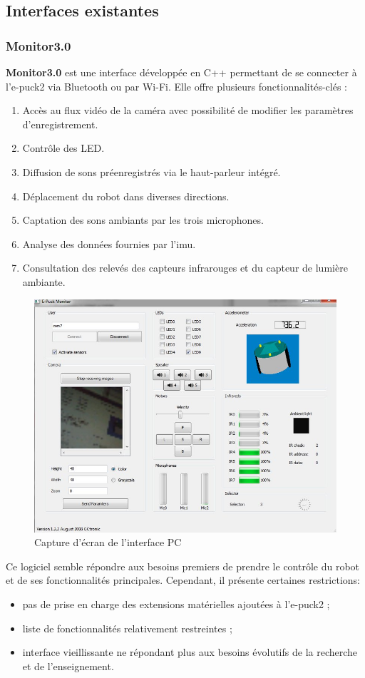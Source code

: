 \subsection{Interfaces existantes} \label{sec:interfaces_existantes}

\subsubsection{Monitor3.0}
\textbf{Monitor3.0} est une interface développée en C++ permettant de se connecter à l'e-puck2 via Bluetooth \autocite{noauthor_e-puck2monitor_2024} ou par Wi-Fi.
Elle offre plusieurs fonctionnalités-clés :
\begin{enumerate}
    \item Accès au flux vidéo de la caméra avec possibilité de modifier les paramètres d'enregistrement.  
    \item Contrôle des LED.  
    \item Diffusion de sons préenregistrés via le haut-parleur intégré.  
    \item Déplacement du robot dans diverses directions.  
    \item Captation des sons ambiants par les trois microphones.  
    \item Analyse des données fournies par l'\acrshort{imu}.
    \item Consultation des relevés des capteurs infrarouges et du capteur de lumière ambiante.  
\end{enumerate}

\begin{figure}[H]
    \centering
    \includegraphics[width=0.6\linewidth]{.//figures//Monitor3.0.png}
    \caption{Capture d'écran de l'interface PC \autocite{gctronic_e-puck2_nodate}}
    \label{fig:screenshot_monitor_interface}
\end{figure}

Ce logiciel semble répondre aux besoins premiers de prendre le contrôle du robot et de ses fonctionnalités principales. 
Cependant, il présente certaines restrictions:
\begin{itemize}
    \item pas de prise en charge des extensions matérielles ajoutées à l'e-puck2 ;
    \item liste de fonctionnalités relativement restreintes ;
    \item interface vieillissante ne répondant plus aux besoins évolutifs de la recherche et de l'enseignement.
\end{itemize}

